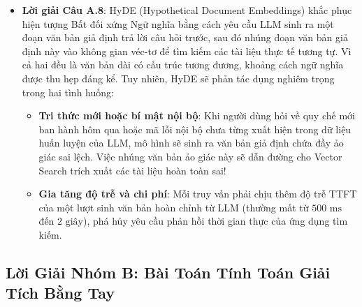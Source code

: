 \begin{itemize}
  \item \textbf{Lời giải Câu A.8}:
  HyDE (Hypothetical Document Embeddings) khắc phục hiện tượng Bất đối xứng Ngữ nghĩa bằng cách yêu cầu LLM sinh ra một đoạn văn bản giả định trả lời câu hỏi trước, sau đó nhúng đoạn văn bản giả định này vào không gian véc-tơ để tìm kiếm các tài liệu thực tế tương tự. Vì cả hai đều là văn bản dài có cấu trúc tương đương, khoảng cách ngữ nghĩa được thu hẹp đáng kể.
  Tuy nhiên, HyDE sẽ phản tác dụng nghiêm trọng trong hai tình huống:
  \begin{itemize}
    \item \textbf{Tri thức mới hoặc bí mật nội bộ}: Khi người dùng hỏi về quy chế mới ban hành hôm qua hoặc mã lỗi nội bộ chưa từng xuất hiện trong dữ liệu huấn luyện của LLM, mô hình sẽ sinh ra văn bản giả định chứa đầy ảo giác sai lệch. Việc nhúng văn bản ảo giác này sẽ dẫn đường cho Vector Search trích xuất các tài liệu hoàn toàn sai!
    \item \textbf{Gia tăng độ trễ và chi phí}: Mỗi truy vấn phải chịu thêm độ trễ TTFT của một lượt sinh văn bản hoàn chỉnh từ LLM (thường mất từ $500\text{ ms}$ đến $2\text{ giây}$), phá hủy yêu cầu phản hồi thời gian thực của ứng dụng tìm kiếm.
  \end{itemize}
\end{itemize}

\subsection{Lời Giải Nhóm B: Bài Toán Tính Toán Giải Tích Bằng Tay}

